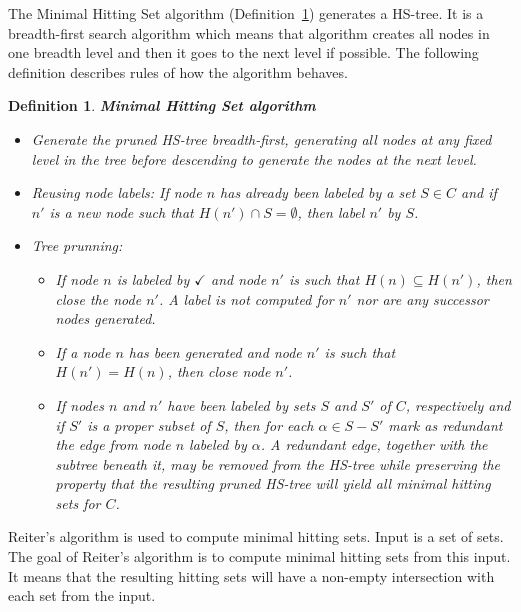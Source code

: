 \documentclass[12pt,a4paper]{article}
\newtheorem{definition}{Definition}[subsection]
\begin{document}
The Minimal Hitting Set algorithm (Definition~\ref{def:mhs}) generates a HS-tree. It is a breadth-first search algorithm which means that algorithm creates all nodes in one breadth level and then it goes to the next level if possible. The following definition describes rules of how the algorithm behaves.

\begin{definition}{\textbf{Minimal Hitting Set algorithm}}{\indent}
	\label{def:mhs}
	\begin{itemize}
		\item Generate the pruned HS-tree breadth-first, generating all nodes at any fixed level in the tree before descending to generate the nodes at the next level.
		
		\item Reusing node labels: If node $n$ has already been labeled by a set $S \in C$ and if $n'$ is a new node such that $H(n') \cap S = \emptyset$, then label $n'$ by $S$.
		
		\item Tree prunning:
		
		\begin{itemize}
			\item If node $n$ is labeled by $\checkmark$ and node $n'$ is such that $H(n) \subseteq H(n')$, then close the node $n'$. A label is not computed for $n'$ nor are any successor nodes generated.
			
			\item If a node $n$ has been generated and node $n'$ is such that $H(n') = H(n)$, then close node $n'$.
			
			\item If nodes $n$ and $n'$ have been labeled by sets $S$ and $S'$ of $C$, respectively and if $S'$ is a proper subset of $S$, then for each $\alpha \in S - S'$ mark as redundant the edge from node $n$ labeled by $\alpha$. A redundant edge, together with the subtree beneath it, may be removed from the HS-tree while preserving the property that the resulting pruned HS-tree will yield all minimal hitting sets for $C$.
			
		\end{itemize}	
		
	\end{itemize}
	
\end{definition}

Reiter's algorithm is used to compute minimal hitting sets. Input is a set of sets. The goal of Reiter's algorithm is to compute minimal hitting sets from this input. It means that the resulting hitting sets will have a non-empty intersection with each set from the input.
\end{document}
